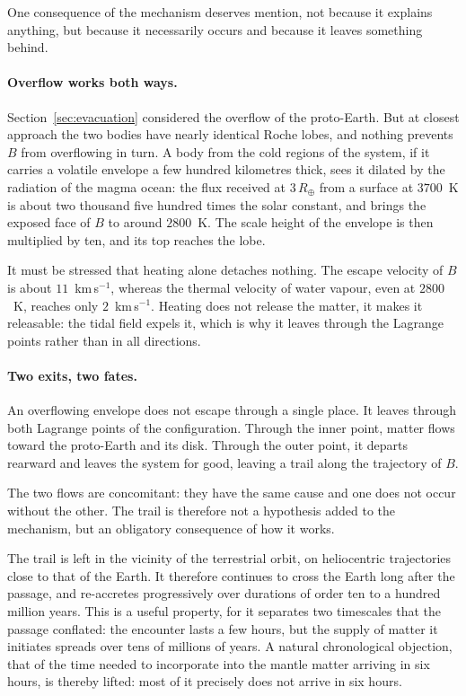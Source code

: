 \documentclass[11pt,a4paper,openany]{report}
\newcommand{\Rt}{R_{\oplus}}
\begin{document}
One consequence of the mechanism deserves mention, not because it explains anything, but because it
necessarily occurs and because it leaves something behind.

\paragraph{Overflow works both ways.} Section~\ref{sec:evacuation} considered the overflow of the
proto-Earth. But at closest approach the two bodies have nearly identical Roche lobes, and nothing
prevents $B$ from overflowing in turn. A body from the cold regions of the system, if it carries a
volatile envelope a few hundred kilometres thick, sees it dilated by the radiation of the magma
ocean: the flux received at $3\,\Rt$ from a surface at $3700$~K is about two thousand five hundred
times the solar constant, and brings the exposed face of $B$ to around $2800$~K. The scale height of
the envelope is then multiplied by ten, and its top reaches the lobe.

It must be stressed that heating alone detaches nothing. The escape velocity of $B$ is about
$11$~km\,s$^{-1}$, whereas the thermal velocity of water vapour, even at $2800$~K, reaches only
$2$~km\,s$^{-1}$. Heating does not release the matter, it makes it releasable: the tidal field
expels it, which is why it leaves through the Lagrange points rather than in all directions.

\paragraph{Two exits, two fates.} An overflowing envelope does not escape through a single place. It
leaves through both Lagrange points of the configuration. Through the inner point, matter flows
toward the proto-Earth and its disk. Through the outer point, it departs rearward and leaves the
system for good, leaving a trail along the trajectory of $B$.

The two flows are concomitant: they have the same cause and one does not occur without the other.
The trail is therefore not a hypothesis added to the mechanism, but an obligatory consequence of how
it works.

\begin{ideephys}
The trail is left in the vicinity of the terrestrial orbit, on heliocentric trajectories close to
that of the Earth. It therefore continues to cross the Earth long after the passage, and re-accretes
progressively over durations of order ten to a hundred million years. This is a useful property, for
it separates two timescales that the passage conflated: the encounter lasts a few hours, but the
supply of matter it initiates spreads over tens of millions of years. A natural chronological
objection, that of the time needed to incorporate into the mantle matter arriving in six hours, is
thereby lifted: most of it precisely does not arrive in six hours.
\end{ideephys}
\end{document}
